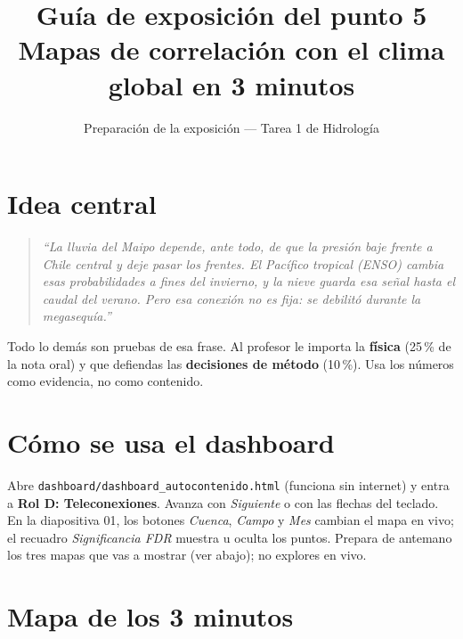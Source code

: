 \documentclass[11pt,letterpaper]{article}
\title{Guía de exposición del punto 5\\\large Mapas de correlación con el clima global en 3 minutos}
\author{Preparación de la exposición --- Tarea 1 de Hidrología}
\date{}
\begin{document}
\sloppy
\maketitle

\section*{Idea central}

\begin{quote}
\emph{``La lluvia del Maipo depende, ante todo, de que la presión baje frente a Chile central y deje pasar los
frentes. El Pacífico tropical (ENSO) cambia esas probabilidades a fines del invierno, y la nieve guarda esa señal
hasta el caudal del verano. Pero esa conexión no es fija: se debilitó durante la megasequía.''}
\end{quote}
Todo lo demás son pruebas de esa frase. Al profesor le importa la \textbf{física} (25\,\% de la nota oral) y que
defiendas las \textbf{decisiones de método} (10\,\%). Usa los números como evidencia, no como contenido.

\section*{Cómo se usa el dashboard}

Abre \texttt{dashboard/dashboard\_autocontenido.html} (funciona sin internet) y entra a \textbf{Rol D:
Teleconexiones}. Avanza con \emph{Siguiente} o con las flechas del teclado. En la diapositiva 01, los botones
\emph{Cuenca}, \emph{Campo} y \emph{Mes} cambian el mapa en vivo; el recuadro \emph{Significancia FDR} muestra u
oculta los puntos. Prepara de antemano los tres mapas que vas a mostrar (ver abajo); no explores en vivo.

\section*{Mapa de los 3 minutos}
\end{document}
